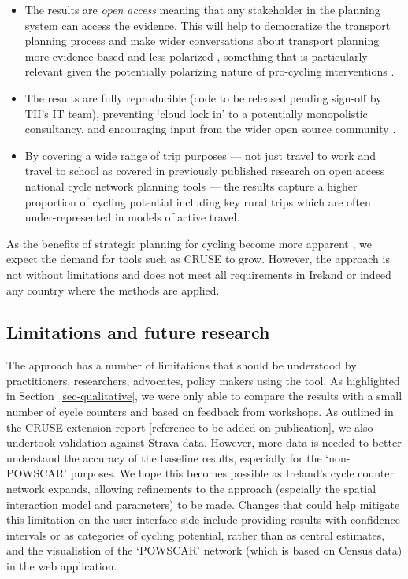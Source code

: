 \documentclass[
  super,
  preprint,
  3p]{elsarticle}
\providecommand{\tightlist}{%
  \setlength{\itemsep}{0pt}\setlength{\parskip}{0pt}}\usepackage{longtable,booktabs,array}
\begin{document}
\begin{itemize}
\tightlist
\item
  The results are \emph{open access} meaning that any stakeholder in the
  planning system can access the evidence. This will help to democratize
  the transport planning process and make wider conversations about
  transport planning more evidence-based and less polarized
  \citep{lovelace2020}, something that is particularly relevant given
  the potentially polarizing nature of pro-cycling interventions
  \citep{wild2017}.
\item
  The results are fully reproducible (code to be released pending
  sign-off by TII's IT team), preventing `cloud lock in' to a
  potentially monopolistic consultancy, and encouraging input from the
  wider open source community \citep{lovelace2021, dhir2017}.
\item
  By covering a wide range of trip purposes --- not just travel to work
  \citep{lovelace2017, heinen2010} and travel to school
  \citep{goodman2019} as covered in previously published research on
  open access national cycle network planning tools --- the results
  capture a higher proportion of cycling potential including key rural
  trips which are often under-represented in models of active travel.
\end{itemize}

As the benefits of strategic planning for cycling become more apparent
\citep{scappini2022}, we expect the demand for tools such as CRUSE to
grow. However, the approach is not without limitations and does not meet
all requirements in Ireland or indeed any country where the methods are
applied.

\subsection{Limitations and future
research}\label{limitations-and-future-research}

The approach has a number of limitations that should be understood by
practitioners, researchers, advocates, policy makers using the tool. As
highlighted in Section~\ref{sec-qualitative}, we were only able to
compare the results with a small number of cycle counters and based on
feedback from workshops. As outlined in the CRUSE extension report
{[}reference to be added on publication{]}, we also undertook validation
against Strava data. However, more data is needed to better understand
the accuracy of the baseline results, especially for the `non-POWSCAR'
purposes. We hope this becomes possible as Ireland's cycle counter
network expands, allowing refinements to the approach (espcially the
spatial interaction model and parameters) to be made. Changes that could
help mitigate this limitation on the user interface side include
providing results with confidence intervals or as categories of cycling
potential, rather than as central estimates, and the visualistion of the
`POWSCAR' network (which is based on Census data) in the web
application.
\end{document}
